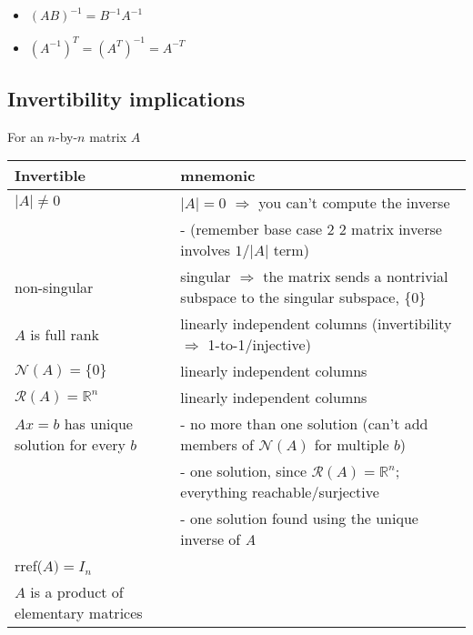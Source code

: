 \documentclass[10pt,letterpaper]{article}
\begin{document}
\begin{itemize}
\item $(AB) ^{-1} = B ^{-1} A ^{-1}$
\item $(A ^{-1}) ^{T} = (A ^{T}) ^{-1}= A ^{-T}$
\end{itemize}
\subsection{Invertibility implications}
\label{sec-13_2}

For an $n$-by-$n$ matrix $A$ 

\begin{center}
\begin{tabular}{ll}
 Invertible                                &  mnemonic                                                                                       \\
\hline
 $\vert A\vert \ne 0$                      &  $\vert A\vert = 0$ $\Rightarrow$ you can't compute the inverse                                 \\
                                           &  - (remember base case 2 \texttimes{} 2 matrix inverse involves $1/\vert A\vert$ term)          \\
 non-singular                              &  singular $\Rightarrow$ the matrix sends a nontrivial subspace to the singular subspace, \{0\}  \\
 $A$ is full rank                          &  linearly independent columns (invertibility $\Rightarrow$ 1-to-1/injective)                    \\
 $\mathcal{N}(A)=\{0\}$                    &  linearly independent columns                                                                   \\
 $\mathcal R (A)= \mathbb{R}^{n}$          &  linearly independent columns                                                                   \\
 $Ax=b$ has unique solution for every $b$  &  - no more than one solution (can't add members of $\mathcal N (A)$ for multiple $b$)           \\
                                           &  - one solution, since $\mathcal R (A)= \mathbb{R}^{n}$; everything reachable/surjective        \\
                                           &  - one solution found using the unique inverse of \emph{A}                                      \\
 rref($A)=I_n$                             &                                                                                                 \\
 $A$ is a product of elementary matrices   &                                                                                                 \\
\end{tabular}
\end{center}
\end{document}
